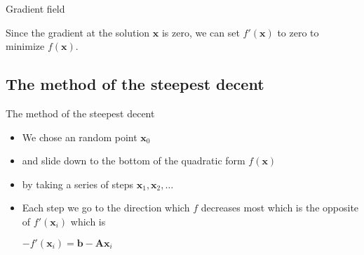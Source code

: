 \documentclass[\classoption]{beamer}
\begin{document}
\begin{frame}[fragile]{Gradient field}

\vspace{-0.25cm}
\begin{center}
\end{center}
\vspace{-0.25cm}
Since the gradient at the solution $\mathbf{x}$ is zero, we can set $f'(\mathbf{x})$ to zero to minimize $f(\mathbf{x})$.

\end{frame}

\subsection{The method of the steepest decent}

\begin{frame}{The method of the steepest decent}

\begin{itemize}
\item We chose an random point $\mathbf{x}_0$
\item and slide down to the bottom of the quadratic form $f(\mathbf{x})$
\item by taking a series of steps $\mathbf{x}_1,\mathbf{x}_2,\ldots$
\item Each step we go to the direction which $f$ decreases most which is the opposite of $f'(\mathbf{x}_i)$ which is
\begin{center}
$-f'(\mathbf{x}_i)= \mathbf{b}-\mathbf{A}\mathbf{x}_i$
\end{center}
\end{itemize}

\end{frame}
\end{document}
